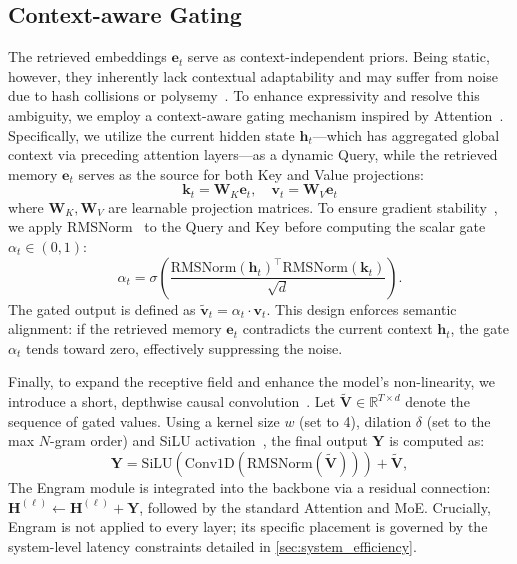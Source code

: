 \subsection{Context-aware Gating}
\label{sec:engram_fusion}
The retrieved embeddings $\mathbf{e}_t$ serve as context-independent priors. Being static, however, they inherently lack contextual adaptability and may suffer from noise due to hash collisions or polysemy~\citep{haber-poesio-2024-polysemy}.
To enhance expressivity and resolve this ambiguity, we employ a context-aware gating mechanism inspired by Attention~\citep{vaswani2017attention,bahdanau2014neural}. Specifically, we utilize the current hidden state $\mathbf{h}_t$—which has aggregated global context via preceding attention layers—as a dynamic Query, while the retrieved memory $\mathbf{e}_t$ serves as the source for both Key and Value projections:
\begin{equation}
    \mathbf{k}_t = \mathbf{W}_K \mathbf{e}_t, \quad \mathbf{v}_t = \mathbf{W}_V \mathbf{e}_t
\end{equation}
where $\mathbf{W}_K, \mathbf{W}_V$ are learnable projection matrices. To ensure gradient stability~\citep{pmlr-v202-dehghani23a}, we apply RMSNorm~\citep{zhang2019root} to the Query and Key before computing the scalar gate $\alpha_t \in (0, 1)$: 
\begin{equation}
    \alpha_t = \sigma\left( \frac{\text{RMSNorm}(\mathbf{h}_t)^\top  \text{RMSNorm}(\mathbf{k}_t)}{\sqrt{d}} \right).
\end{equation}
The gated output is defined as $\tilde{\mathbf{v}}_t = \alpha_t \cdot \mathbf{v}_t$. This design enforces semantic alignment: if the retrieved memory $\mathbf{e}_t$ contradicts the current context $\mathbf{h}_t$, the gate $\alpha_t$ tends toward zero, effectively suppressing the noise.

Finally, to expand the receptive field and enhance the model's non-linearity, we introduce a short, depthwise causal convolution~\citep{gu2021efficiently,peng2023rwkv}. Let $\tilde{\mathbf{V}} \in \mathbb{R}^{T \times d}$ denote the sequence of gated values. Using a kernel size $w$ (set to 4), dilation $\delta$ (set to the max $N$-gram order) and SiLU activation~\citep{elfwing2018sigmoid}, the final output $\mathbf{Y}$ is computed as: 
\begin{equation}
    \mathbf{Y} = \text{SiLU}\left( \text{Conv1D}( \text{RMSNorm}(\tilde{\mathbf{V}}) ) \right) + \tilde{\mathbf{V}}, 
\end{equation}
The Engram module is integrated into the backbone via a residual connection: $\mathbf{H}^{(\ell)} \leftarrow \mathbf{H}^{(\ell)} + \mathbf{Y}$, followed by the standard Attention and MoE. Crucially, Engram is not applied to every layer; its specific placement is governed by the system-level latency constraints detailed in \autoref{sec:system_efficiency}.


